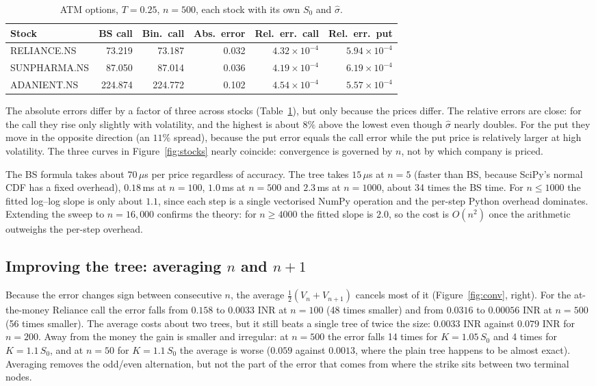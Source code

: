 \documentclass[10pt,a4paper]{article}
\begin{document}
\begin{table}[tb]
\centering\small
\caption{ATM options, $T=0.25$, $n=500$, each stock with its own $S_0$ and $\hat\sigma$.}\label{tab:stocks}
\begin{tabular}{lrrrrr}\toprule
Stock & BS call & Bin.\ call & Abs.\ error & Rel.\ err.\ call & Rel.\ err.\ put\\\midrule
RELIANCE.NS & 73.219 & 73.187 & 0.032 & $4.32\times10^{-4}$ & $5.94\times10^{-4}$\\
SUNPHARMA.NS & 87.050 & 87.014 & 0.036 & $4.19\times10^{-4}$ & $6.19\times10^{-4}$\\
ADANIENT.NS & 224.874 & 224.772 & 0.102 & $4.54\times10^{-4}$ & $5.57\times10^{-4}$\\\bottomrule
\end{tabular}
\end{table}

The absolute errors differ by a factor of three across stocks (Table~\ref{tab:stocks}), but only because
the prices differ. The relative errors are close: for the call they rise only slightly with volatility,
and the highest is about $8\%$ above the lowest even though $\hat\sigma$ nearly doubles. For the put they
move in the opposite direction (an $11\%$ spread), because the put error equals the call error while the
put price is relatively larger at high volatility. The three curves in Figure~\ref{fig:stocks} nearly
coincide: convergence is governed by $n$, not by which company is priced.

The BS formula takes about $70\,\mu$s per price regardless of accuracy. The tree takes $15\,\mu$s at $n=5$
(faster than BS, because SciPy's normal CDF has a fixed overhead), $0.18$\,ms at $n=100$, $1.0$\,ms at $n=500$
and $2.3$\,ms at $n=1000$, about 34 times the BS time. For $n\le1000$ the fitted log--log slope is only
about $1.1$, since each step is a single vectorised NumPy operation and the per-step Python overhead dominates.
Extending the sweep to $n=16{,}000$ confirms the theory: for $n\ge4000$ the fitted slope is $2.0$, so the
cost is $O(n^2)$ once the arithmetic outweighs the per-step overhead.

\subsection{Improving the tree: averaging $n$ and $n+1$}
Because the error changes sign between consecutive $n$, the average
$\tfrac12(V_n+V_{n+1})$ cancels most of it (Figure~\ref{fig:conv}, right). For the at-the-money Reliance call
the error falls from $0.158$ to $0.0033$ INR at $n=100$ (48 times smaller) and from $0.0316$ to $0.00056$ INR
at $n=500$ (56 times smaller). The average costs about two trees, but it still beats a single tree of twice
the size: $0.0033$ INR against $0.079$ INR for $n=200$. Away from the money the gain is smaller and
irregular: at $n=500$ the error falls 14 times for $K=1.05\,S_0$ and 4 times for $K=1.1\,S_0$, and at $n=50$
for $K=1.1\,S_0$ the average is worse ($0.059$ against $0.0013$, where the plain tree happens to be almost
exact). Averaging removes the odd/even alternation, but not the part of the error that comes from where the
strike sits between two terminal nodes.
\end{document}
